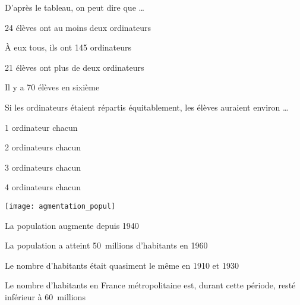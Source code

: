\begin{QCM}
\begin{GroupeQCM}
    
    \begin{exercice}
      D'après le tableau, on peut dire que \ldots
      \begin{ChoixQCM}{4}
      \item 24 élèves ont au moins deux ordinateurs
      \item À eux tous, ils ont 145 ordinateurs
      \item 21 élèves ont plus de deux ordinateurs
      \item Il y a 70 élèves en sixième
      \end{ChoixQCM}
\begin{corrige}
   \end{corrige}
    \end{exercice}
    
    
    \begin{exercice}
      Si les ordinateurs étaient répartis équitablement, les élèves auraient environ \ldots
      \begin{ChoixQCM}{4}
      \item 1 ordinateur chacun
      \item 2 ordinateurs chacun 
      \item 3 ordinateurs chacun
      \item 4 ordinateurs chacun
      \end{ChoixQCM}
\begin{corrige}
   \end{corrige}
    \end{exercice}
    
    
    \begin{exercice}
      \begin{center} \texttt{[image: agmentation\_popul]} \end{center}
      \begin{ChoixQCM}{4}
      \item La population augmente depuis 1940
      \item La population a atteint 50 millions d'habitants en 1960
      \item Le nombre d'habitants était quasiment le même en 1910 et 1930
      \item Le nombre d'habitants en France métropolitaine est, durant cette période, resté inférieur à 60 millions
      \end{ChoixQCM}
\begin{corrige}
   \end{corrige}
    \end{exercice}
 

\end{GroupeQCM}
\end{QCM}
